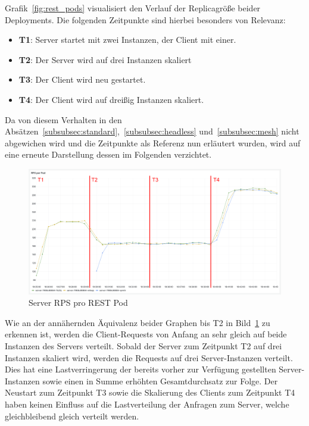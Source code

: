 Grafik~\ref{fig:rest_pods} visualisiert den Verlauf der Replicagröße beider Deployments.
Die folgenden Zeitpunkte sind hierbei besonders von Relevanz:
\begin{itemize}
    \item \textbf{T1}: Server startet mit zwei Instanzen, der Client mit einer.
    \item \textbf{T2}: Der Server wird auf drei Instanzen skaliert
    \item \textbf{T3}: Der Client wird neu gestartet.
    \item \textbf{T4}: Der Client wird auf dreißig Instanzen skaliert.
\end{itemize}

Da von diesem Verhalten in den Absätzen~\ref{subsubsec:standard},~\ref{subsubsec:headless} und~\ref{subsubsec:mesh} nicht abgewichen wird und die Zeitpunkte als Referenz nun erläutert wurden, wird auf eine erneute Darstellung dessen im Folgenden verzichtet.

\begin{figure}[H]
    \centering
    \includegraphics[width=1\textwidth]{img/rest_rps}
    \caption{Server RPS pro REST Pod}
    \label{fig:rest_rps}
\end{figure}

Wie an der annähernden Äquivalenz beider Graphen bis T2 in Bild~\ref{fig:rest_rps} zu erkennen ist, werden die Client-Requests von Anfang an sehr gleich auf beide Instanzen des Servers verteilt.
Sobald der Server zum Zeitpunkt T2 auf drei Instanzen skaliert wird, werden die Requests auf drei Server-Instanzen verteilt.
Dies hat eine Lastverringerung der bereits vorher zur Verfügung gestellten Server-Instanzen sowie einen in Summe erhöhten Gesamtdurchsatz zur Folge.
Der Neustart zum Zeitpunkt T3 sowie die Skalierung des Clients zum Zeitpunkt T4 haben keinen Einfluss auf die Lastverteilung der Anfragen zum Server, welche gleichbleibend gleich verteilt werden.

